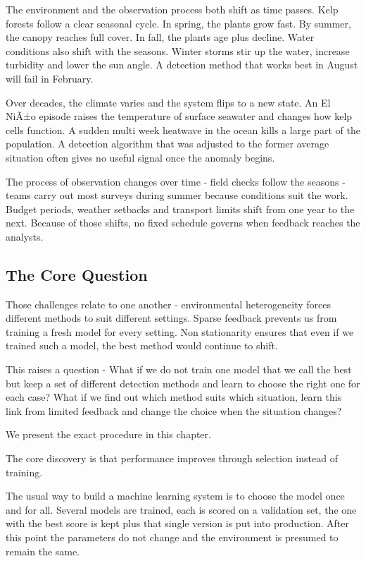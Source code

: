 \documentclass[11pt,a4paper]{article}
\begin{document}
The environment and the observation process both shift as time passes. Kelp forests follow a clear seasonal cycle. In spring, the plants grow fast. By summer, the canopy reaches full cover. In fall, the plants age plus decline. Water conditions also shift with the seasons. Winter storms stir up the water, increase turbidity and lower the sun angle. A detection method that works best in August will fail in February.

Over decades, the climate varies and the system flips to a new state. An El NiÃ±o episode raises the temperature of surface seawater and changes how kelp cells function. A sudden multi week heatwave in the ocean kills a large part of the population. A detection algorithm that was adjusted to the former average situation often gives no useful signal once the anomaly begins.

The process of observation changes over time - field checks follow the seasons - teams carry out most surveys during summer because conditions suit the work. Budget periods, weather setbacks and transport limits shift from one year to the next. Because of those shifts, no fixed schedule governs when feedback reaches the analysts.

\subsection{The Core Question}

Those challenges relate to one another - environmental heterogeneity forces different methods to suit different settings. Sparse feedback prevents us from training a fresh model for every setting. Non stationarity ensures that even if we trained such a model, the best method would continue to shift.

This raises a question - What if we do not train one model that we call the best but keep a set of different detection methods and learn to choose the right one for each case? What if we find out which method suits which situation, learn this link from limited feedback and change the choice when the situation changes?

We present the exact procedure in this chapter.


The core discovery is that performance improves through selection instead of training.

The usual way to build a machine learning system is to choose the model once and for all. Several models are trained, each is scored on a validation set, the one with the best score is kept plus that single version is put into production. After this point the parameters do not change and the environment is presumed to remain the same.
\end{document}
